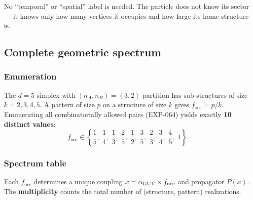 No ``temporal'' or ``spatial'' label is needed.  The particle does not know its sector --- it knows only how many vertices it occupies and how large its home structure is.

\subsection{Complete geometric spectrum}
\label{sec:spectrum}

\subsubsection{Enumeration}

The $d = 5$ simplex with $(n_A, n_B) = (3,2)$ partition has sub-structures of size $k = 2, 3, 4, 5$.  A pattern of size $p$ on a structure of size $k$ gives $f_\mathrm{occ} = p/k$.  Enumerating all combinatorially allowed pairs (EXP-064) yields exactly \textbf{10 distinct values}:
\begin{equation}
f_\mathrm{occ} \in \left\{\frac{1}{5},\;\frac{1}{4},\;\frac{1}{3},\;\frac{2}{5},\;\frac{1}{2},\;\frac{3}{5},\;\frac{2}{3},\;\frac{3}{4},\;\frac{4}{5},\;1\right\}.
\end{equation}

\subsubsection{Spectrum table}

Each $f_\mathrm{occ}$ determines a unique coupling $x = \alpha_{\mathrm{GUT}} \times f_\mathrm{occ}$ and propagator $P(x)$.  The \textbf{multiplicity} counts the total number of (structure, pattern) realizations.

